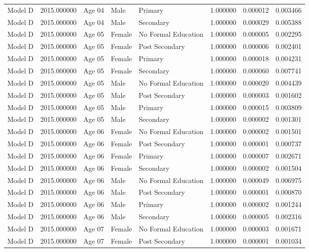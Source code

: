 \begin{table}[ht]
\begin{tabular}{lrlllrrr}
Model D & 2015.000000 & Age 04 & Male & Primary & 1.000000 & 0.000012 & 0.003466 \\
Model D & 2015.000000 & Age 04 & Male & Secondary & 1.000000 & 0.000029 & 0.005388 \\
Model D & 2015.000000 & Age 05 & Female & No Formal Education & 1.000000 & 0.000005 & 0.002295 \\
Model D & 2015.000000 & Age 05 & Female & Post Secondary & 1.000000 & 0.000006 & 0.002401 \\
Model D & 2015.000000 & Age 05 & Female & Primary & 1.000000 & 0.000018 & 0.004231 \\
Model D & 2015.000000 & Age 05 & Female & Secondary & 1.000000 & 0.000060 & 0.007741 \\
Model D & 2015.000000 & Age 05 & Male & No Formal Education & 1.000000 & 0.000020 & 0.004439 \\
Model D & 2015.000000 & Age 05 & Male & Post Secondary & 1.000000 & 0.000003 & 0.001602 \\
Model D & 2015.000000 & Age 05 & Male & Primary & 1.000000 & 0.000015 & 0.003809 \\
Model D & 2015.000000 & Age 05 & Male & Secondary & 1.000000 & 0.000002 & 0.001301 \\
Model D & 2015.000000 & Age 06 & Female & No Formal Education & 1.000000 & 0.000002 & 0.001501 \\
Model D & 2015.000000 & Age 06 & Female & Post Secondary & 1.000000 & 0.000001 & 0.000737 \\
Model D & 2015.000000 & Age 06 & Female & Primary & 1.000000 & 0.000007 & 0.002671 \\
Model D & 2015.000000 & Age 06 & Female & Secondary & 1.000000 & 0.000002 & 0.001504 \\
Model D & 2015.000000 & Age 06 & Male & No Formal Education & 1.000000 & 0.000049 & 0.006975 \\
Model D & 2015.000000 & Age 06 & Male & Post Secondary & 1.000000 & 0.000001 & 0.000870 \\
Model D & 2015.000000 & Age 06 & Male & Primary & 1.000000 & 0.000002 & 0.001244 \\
Model D & 2015.000000 & Age 06 & Male & Secondary & 1.000000 & 0.000005 & 0.002316 \\
Model D & 2015.000000 & Age 07 & Female & No Formal Education & 1.000000 & 0.000003 & 0.001671 \\
Model D & 2015.000000 & Age 07 & Female & Post Secondary & 1.000000 & 0.000001 & 0.001034 \\

\end{tabular}
\end{table}
